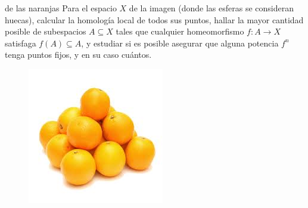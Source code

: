 \documentclass[twoside]{article}
\begin{document}
\newpage


\begin{ejercicio}{de las naranjas}
Para el espacio $X$ de la imagen (donde las esferas se consideran huecas), calcular la homología local de todos sus puntos, hallar la mayor cantidad posible de subespacios $A\subseteq X$ tales que cualquier homeomorfismo $f:A\to X$ satisfaga $f(A)\subseteq A$, y estudiar si es posible asegurar que alguna potencia $f^n$ tenga puntos fijos, y en su caso cuántos. 

\begin{figure}[h!]
\centering
\includegraphics[scale=0.5]{naranjas}
\end{figure}
\end{ejercicio}
\end{document}
